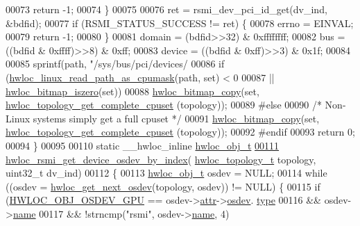 \begin{DoxyCode}
00073     \textcolor{keywordflow}{return} -1;
00074   \}
00075 
00076   ret = rsmi\_dev\_pci\_id\_get(dv\_ind, &bdfid);
00077   \textcolor{keywordflow}{if} (RSMI\_STATUS\_SUCCESS != ret) \{
00078     errno = EINVAL;
00079     \textcolor{keywordflow}{return} -1;
00080   \}
00081   domain = (bdfid>>32) & 0xffffffff;
00082   bus = ((bdfid & 0xffff)>>8) & 0xff;
00083   device = ((bdfid & 0xff)>>3) & 0x1f;
00084 
00085   sprintf(path, \textcolor{stringliteral}{"/sys/bus/pci/devices/%
00086   \textcolor{keywordflow}{if} (\hyperlink{a00214_gaf72d83e273803226ce772973e37b85de}{hwloc\_linux\_read\_path\_as\_cpumask}(path, \textcolor{keyword}{set}) < 0
00087       || \hyperlink{a00205_ga5b64be28f5a7176ed8ad0d6a90bdf108}{hwloc\_bitmap\_iszero}(\textcolor{keyword}{set}))
00088     \hyperlink{a00205_ga72a29824798b48784b8217471ec8f14c}{hwloc\_bitmap\_copy}(\textcolor{keyword}{set}, \hyperlink{a00202_gaee30e03391c1ed7dfd617fb5c7bbb033}{hwloc\_topology\_get\_complete\_cpuset}
      (topology));
00089 \textcolor{preprocessor}{#else}
00090   \textcolor{comment}{/* Non-Linux systems simply get a full cpuset */}
00091   \hyperlink{a00205_ga72a29824798b48784b8217471ec8f14c}{hwloc\_bitmap\_copy}(\textcolor{keyword}{set}, \hyperlink{a00202_gaee30e03391c1ed7dfd617fb5c7bbb033}{hwloc\_topology\_get\_complete\_cpuset}
      (topology));
00092 \textcolor{preprocessor}{#endif}
00093   \textcolor{keywordflow}{return} 0;
00094 \}
00095 
00110 \textcolor{keyword}{static} \_\_hwloc\_inline \hyperlink{a00238}{hwloc\_obj\_t}
\hyperlink{a00222_ga507d0acdd5e9ac374a8d120d59604c80}{00111} \hyperlink{a00222_ga507d0acdd5e9ac374a8d120d59604c80}{hwloc\_rsmi\_get\_device\_osdev\_by\_index}(
      \hyperlink{a00186_ga9d1e76ee15a7dee158b786c30b6a6e38}{hwloc\_topology\_t} topology, uint32\_t dv\_ind)
00112 \{
00113   \hyperlink{a00238}{hwloc\_obj\_t} osdev = NULL;
00114   \textcolor{keywordflow}{while} ((osdev = \hyperlink{a00204_ga8b4584c8949e2c5f1c97ba7fe92b8145}{hwloc\_get\_next\_osdev}(topology, osdev)) != NULL) \{
00115     \textcolor{keywordflow}{if} (\hyperlink{a00184_gga64f5d539df299c97ae80ce53fc4b56c0aa3a09798ef2836abb236dc3a645ffc90}{HWLOC\_OBJ\_OSDEV\_GPU} == osdev->\hyperlink{a00238_accd40e29f71f19e88db62ea3df02adc8}{attr}->\hyperlink{a00242_a22904c25fe44b323bab5c9bc52660fca}{osdev}.
      \hyperlink{a00282_a31e019e27e54ac6138d04be639bb96f9}{type}
00116       && osdev->\hyperlink{a00238_abb709ec38f2970677e4e57d1d30be96d}{name}
00117       && !strncmp(\textcolor{stringliteral}{"rsmi"}, osdev->\hyperlink{a00238_abb709ec38f2970677e4e57d1d30be96d}{name}, 4)
}
\end{DoxyCode}
